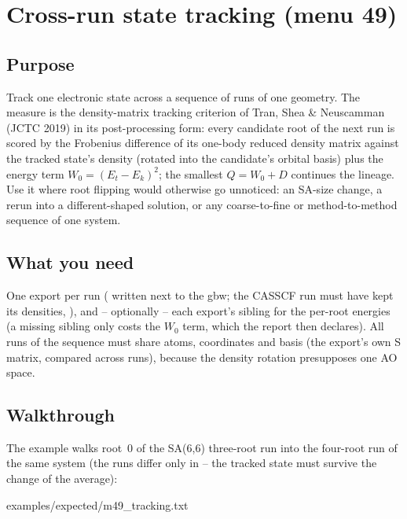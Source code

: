 \chapter{Cross-run state tracking (menu 49)}
\label{ch:menu49}

\section{Purpose}

Track one electronic state across a sequence of runs of one geometry.
The measure is the density-matrix tracking criterion of Tran, Shea \&
Neuscamman (JCTC 2019) in its post-processing form: every candidate root
of the next run is scored by the Frobenius difference of its one-body
reduced density matrix against the tracked state's density (rotated into
the candidate's orbital basis) plus the energy term $W_0 = (E_t -
E_k)^2$; the smallest $Q = W_0 + D$ continues the lineage.  Use it where
root flipping would otherwise go unnoticed: an SA-size change, a rerun
into a different-shaped solution, or any coarse-to-fine or
method-to-method sequence of one system.

\section{What you need}

One  export per run
( written next to the gbw; the CASSCF run must have kept its
densities, ), and -- optionally -- each export's sibling
 for the per-root energies (a missing sibling only costs the
$W_0$ term, which the report then declares).  All runs of the sequence
must share atoms, coordinates and basis (the export's own S matrix,
compared across runs), because the density rotation presupposes one AO
space.

\section{Walkthrough}

The example walks root~0 of the SA(6,6) three-root run into the
four-root run of the same system (the runs differ only in 
-- the tracked state must survive the change of the average):


  {examples/expected/m49_tracking.txt}

